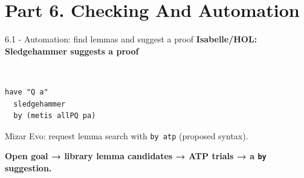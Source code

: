 \documentclass[aspectratio=169,11pt]{beamer}
\newcommand{\statusbadge}[2]{\colorbox{#1}{\textcolor{white}{\strut\scriptsize\sffamily\bfseries #2}}}
\newcommand{\badgeSketch}{\statusbadge{orange!75!black}{sketch}}
\begin{document}
\section{Part 6. Checking And Automation}
\begin{frame}[fragile,t]{6.1 - Automation: find lemmas and suggest a proof}
\smallskip
\textbf{Isabelle/HOL: Sledgehammer suggests a proof}~\badgeSketch
\begin{lstlisting}[language={},basicstyle=\ttfamily\small]
have "Q a"
  sledgehammer
  by (metis allPQ pa)
\end{lstlisting}
Mizar Evo: request lemma search with \texttt{by atp} (proposed syntax).

\textcolor{blue!55!black}{\textbf{Open goal → library lemma candidates → ATP trials → a \texttt{by} suggestion.}}


\end{frame}
\end{document}
